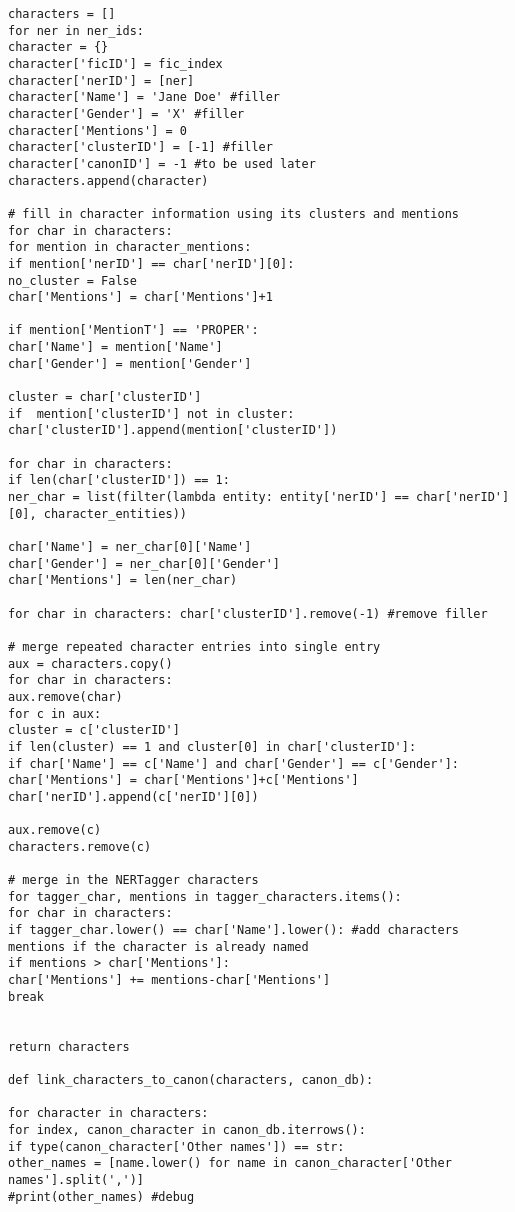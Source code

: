 \documentclass{pre-tfg}
\begin{document}
\begin{lstlisting}[style=consola]
characters = []
for ner in ner_ids:
character = {}
character['ficID'] = fic_index
character['nerID'] = [ner]
character['Name'] = 'Jane Doe' #filler
character['Gender'] = 'X' #filler
character['Mentions'] = 0
character['clusterID'] = [-1] #filler
character['canonID'] = -1 #to be used later
characters.append(character)

# fill in character information using its clusters and mentions
for char in characters:
for mention in character_mentions:
if mention['nerID'] == char['nerID'][0]:
no_cluster = False
char['Mentions'] = char['Mentions']+1

if mention['MentionT'] == 'PROPER':
char['Name'] = mention['Name']
char['Gender'] = mention['Gender']

cluster = char['clusterID']
if  mention['clusterID'] not in cluster: char['clusterID'].append(mention['clusterID'])

for char in characters:
if len(char['clusterID']) == 1:
ner_char = list(filter(lambda entity: entity['nerID'] == char['nerID'][0], character_entities))

char['Name'] = ner_char[0]['Name']
char['Gender'] = ner_char[0]['Gender']
char['Mentions'] = len(ner_char)  		

for char in characters: char['clusterID'].remove(-1) #remove filler

# merge repeated character entries into single entry
aux = characters.copy()
for char in characters:
aux.remove(char)
for c in aux:
cluster = c['clusterID']
if len(cluster) == 1 and cluster[0] in char['clusterID']:
if char['Name'] == c['Name'] and char['Gender'] == c['Gender']:
char['Mentions'] = char['Mentions']+c['Mentions']
char['nerID'].append(c['nerID'][0])

aux.remove(c)
characters.remove(c)

# merge in the NERTagger characters
for tagger_char, mentions in tagger_characters.items():
for char in characters:
if tagger_char.lower() == char['Name'].lower(): #add characters mentions if the character is already named
if mentions > char['Mentions']:
char['Mentions'] += mentions-char['Mentions']
break


return characters

def link_characters_to_canon(characters, canon_db):

for character in characters:
for index, canon_character in canon_db.iterrows():
if type(canon_character['Other names']) == str:
other_names = [name.lower() for name in canon_character['Other names'].split(',')]
#print(other_names) #debug


\end{lstlisting}
\end{document}
